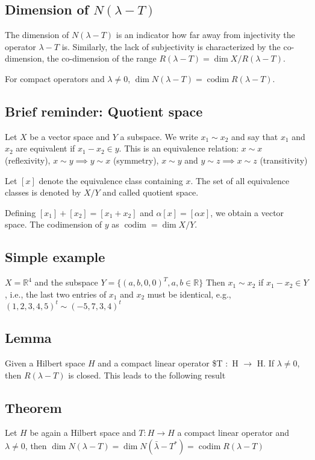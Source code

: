 \documentclass[11pt]{article}
\def\R{\mathbb{R}}
\begin{document}
\subsection{Dimension of \(N(\lambda - T)\)}
\label{sec:orgfc58e1b}
The dimension of \(N(\lambda - T)\) is an indicator how far away from
injectivity the operator \(\lambda - T\) is. Similarly, the lack of subjectivity is
characterized by the co-dimension, the co-dimension of the range \(R(\lambda -
   T) = \dim X/R(\lambda - T)\).

For compact operators and \(\lambda \neq 0\), \(\dim N(\lambda -T) =
   \operatorname{codim} R(\lambda - T)\).
\subsection{Brief reminder: Quotient space}
\label{sec:orgdd3817b}
Let \(X\) be a vector space and \(Y\) a subspace. We write \(x_1 \sim x_2\) and say
that \(x_1\) and \(x_2\) are equivalent if \(x_1 - x_2 \in y\). This is an
equivalence relation: \(x \sim x\) (reflexivity), \(x \sim y \implies y \sim x\)
(symmetry), \(x \sim y\) and \(y \sim z \implies x \sim z\) (transitivity)

Let \([x]\) denote the equivalence class containing \(x\). The set of all
equivalence classes is denoted by \(X/Y\) and called quotient space.

Defining \([x_1] + [x_2] = [x_1 + x_2]\) and \(\alpha[x] = [\alpha x]\), we
obtain a vector space. The codimension of \(y\) as \(\operatorname{codim} = \dim
   X / Y\).
\subsection{Simple example}
\label{sec:org8055aa3}
\(X = \R^4\) and the subspace \(Y = \{(a, b, 0, 0)^T, a, b \in \R\}\) Then \(x_1
   \sim x_2\) if \(x_1 - x_2 \in Y\), i.e., the last two entries of \(x_1\) and \(x_2\)
must be identical, e.g., \((1, 2, 3, 4, 5)^t \sim (-5, 7, 3, 4)^t\)
\subsection{Lemma}
\label{sec:orgb37095f}
Given a Hilbert space \(H\) and a compact linear operator \$T \(\colon\) H
\(\rightarrow\) H. If \(\lambda \neq 0\), then \(R(\lambda - T)\) is closed. This
leads to the following result
\subsection{Theorem}
\label{sec:org9e9782c}
Let \(H\) be again a Hilbert space and \(T \colon H \rightarrow H\) a compact
linear operator and \(\lambda \neq 0\), then \(\dim N(\lambda - T) = \dim
   N(\bar{\lambda} - T^{*}) = \operatorname{codim} R(\lambda - T)\)
\end{document}
